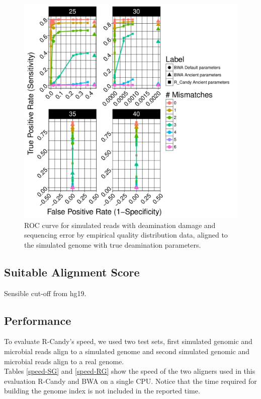 \documentclass[11pt,a4paper]{report}
\begin{document}
\begin{figure}[H]
\centering
\includegraphics[width=12cm]{pictures/bROC_DS4_emp.pdf}
\caption{ROC curve for simulated reads with deamination damage and sequencing error 
by empirical quality distribution data, aligned to the simulated genome
         with true deamination parameters.}
\label{DS4_emp}
\end{figure}



\subsection{Suitable Alignment Score}
Sensible cut-off from hg19.



\subsection{Performance} \label{Performance}

To evaluate R-Candy's speed, we used two test sets, first simulated genomic 
and microbial reads align to a simulated genome and second simulated genomic
and microbial reads align to a real genome.\\

Tables \ref{speed-SG} and \ref{speed-RG} show the speed of 
the two aligners used in this evaluation
R-Candy and BWA on a single CPU.
Notice that the time required for building the genome index is 
not included in the reported time.\\
\end{document}
